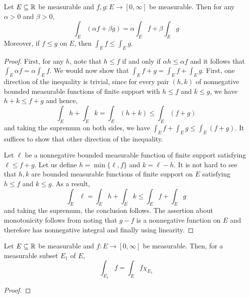 \begin{theorem}
    Let $E\subseteq\mathbb{R}$ be measurable and $f,g: E\to[0,\infty]$ be measurable. Then for any $\alpha > 0$ and $\beta > 0$, 
    \begin{equation*}
        \int_E(\alpha f + \beta g) = \alpha\int_E f + \beta\int_E g
    \end{equation*}
    Moreover, if $f\le g$ on $E$, then $\int_E f\le\int_E g$.
\end{theorem}
\begin{proof}
    First, for any $h$, note that $h\le f$ if and only if $\alpha h\le\alpha f$ and it follows that $\int_E\alpha f = \alpha\int_E f$. We would now show that $\int_E f + g = \int_E f + \int_E g$. First, one direction of the inequality is trivial, since for every pair $(h,k)$ of nonnegative bounded measurable functions of finite support with $h\le f$ and $k\le g$, we have $h + k\le f + g$ and hence,
    \begin{equation*}
        \int_E h + \int_E k = \int_E (h + k)\le\int_E(f + g)
    \end{equation*}
    and taking the supremum on both sides, we have $\int_E f + \int_E g\le\int_E(f + g)$. It suffices to show that other direction of the inequality.

    Let $\ell$ be a nonnegative bounded measurable function of finite support satisfying $\ell\le f + g$. Let us define $h = \min\{\ell, f\}$ and $k = \ell - h$. It is not hard to see that $h,k$ are bounded measurable functions of finite support on $E$ satisfying $h\le f$ and $k\le g$. As a result, 
    \begin{equation*}
        \int_E\ell = \int_E h + \int_E k\le \int_E f + \int_E g
    \end{equation*}
    and taking the supremum, the conclusion follows. The assertion about monotonicity follows from noting that $g - f$ is a nonnegative function on $E$ and therefore has nonnegative integral and finally using linearity.
\end{proof}

\begin{lemma}
    Let $E\subseteq\mathbb{R}$ be measurable and $f: E\to[0,\infty]$ be measurable. Then, for a measurable subset $E_1$ of $E$,
    \begin{equation*}
        \int_{E_1}f = \int_E f\chi_{E_1}
    \end{equation*}
\end{lemma}
\begin{proof}
    
\end{proof}

